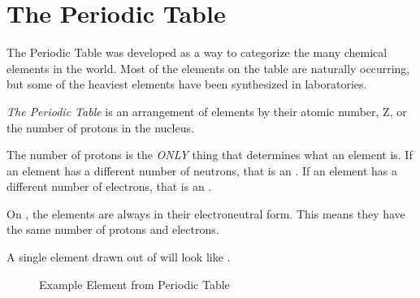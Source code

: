 \section{The Periodic Table} \label{sec:Periodic Table}
The Periodic Table was developed as a way to categorize the many chemical elements in the world.
Most of the elements on the table are naturally occurring, but some of the heaviest elements have been synthesized in laboratories.
\begin{definition} \label{def:Periodic Table}
  \emph{The Periodic Table} is an arrangement of elements by their atomic number, Z, or the number of protons in the nucleus.
  \begin{remark}
    The number of protons is the \emph{ONLY} thing that determines what an element is.
    If an element has a different number of neutrons, that is an .
    If an element has a different number of electrons, that is an .
  \end{remark}
  \begin{remark}
    On , the elements are always in their electroneutral form.
    This means they have the same number of protons and electrons.
  \end{remark}
\end{definition}

A single element drawn out of  will look like \figurename.
\begin{figure}[h!]
  \caption{Example Element from Periodic Table}
  \label{fig:Single Element Periodic Table}
\end{figure}